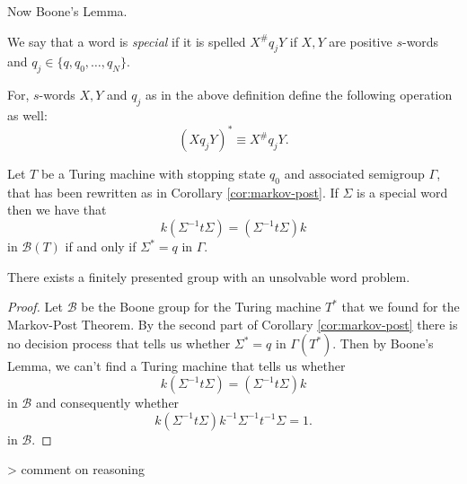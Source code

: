 Now Boone's Lemma.

\begin{definition}
  We say that a word is \emph{special} if it is spelled $X^{\#}q_jY$ if $X,Y$ are positive $s$-words and $q_j \in \{q,q_0,\dots,q_N\}$.
\end{definition}

For, $s$-words $X,Y$ and $q_j$ as in the above definition define the following operation as well:
\begin{equation*}
  (Xq_jY)^* \equiv X^{\#}q_jY.
\end{equation*}

\begin{lemma}[Boone]
  Let $T$ be a Turing machine with stopping state $q_0$ and associated semigroup $\Gamma$, that has been rewritten as in Corollary \ref{cor:markov-post}. If $\Sigma$ is a special word then we have that
  \begin{equation*}
    k(\Sigma^{-1}t\Sigma) = (\Sigma^{-1}t \Sigma)k
  \end{equation*}
  in $\mathcal{B}(T)$ if and only if $\Sigma^* = q$ in $\Gamma$.
\end{lemma}

\begin{theorem}
  There exists a finitely presented group with an unsolvable word problem.
\end{theorem}

\begin{proof}
  Let $\mathcal{B}$ be the Boone group for the Turing machine $T^*$ that we found for the Markov-Post Theorem. By the second part of Corollary \ref{cor:markov-post} there is no decision process that tells us whether $\Sigma^* = q$ in $\Gamma(T^*)$. Then by Boone's Lemma, we can't find a Turing machine that tells us whether
  \begin{equation*}
    k(\Sigma^{-1}t\Sigma) = (\Sigma^{-1}t \Sigma)k
  \end{equation*}
  in $\mathcal{B}$ and consequently whether
  \begin{equation*}
    k(\Sigma^{-1}t\Sigma)k^{-1}\Sigma^{-1}t^{-1}\Sigma = 1.
  \end{equation*}
  in $\mathcal{B}$.
\end{proof}

> comment on reasoning

